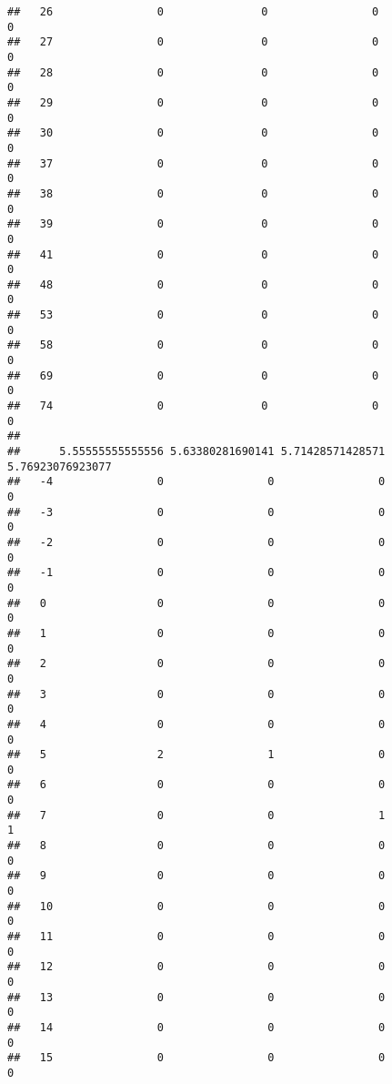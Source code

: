 \documentclass[]{article}
\begin{document}
\begin{verbatim}
##   26                0               0                0                0
##   27                0               0                0                0
##   28                0               0                0                0
##   29                0               0                0                0
##   30                0               0                0                0
##   37                0               0                0                0
##   38                0               0                0                0
##   39                0               0                0                0
##   41                0               0                0                0
##   48                0               0                0                0
##   53                0               0                0                0
##   58                0               0                0                0
##   69                0               0                0                0
##   74                0               0                0                0
##     
##      5.55555555555556 5.63380281690141 5.71428571428571 5.76923076923077
##   -4                0                0                0                0
##   -3                0                0                0                0
##   -2                0                0                0                0
##   -1                0                0                0                0
##   0                 0                0                0                0
##   1                 0                0                0                0
##   2                 0                0                0                0
##   3                 0                0                0                0
##   4                 0                0                0                0
##   5                 2                1                0                0
##   6                 0                0                0                0
##   7                 0                0                1                1
##   8                 0                0                0                0
##   9                 0                0                0                0
##   10                0                0                0                0
##   11                0                0                0                0
##   12                0                0                0                0
##   13                0                0                0                0
##   14                0                0                0                0
##   15                0                0                0                0

\end{verbatim}
\end{document}
